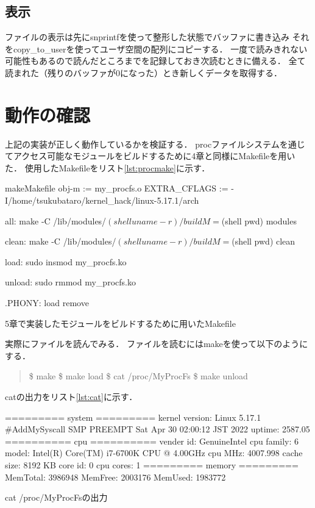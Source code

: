 \subsection{表示}
ファイルの表示は先にsnprintfを使って整形した状態でバッファに書き込み
それをcopy_to_userを使ってユーザ空間の配列にコピーする．
一度で読みきれない可能性もあるので読んだところまでを記録しておき次読むときに備える．
全て読まれた（残りのバッファが0になった）とき新しくデータを取得する．

\section{動作の確認}
上記の実装が正しく動作しているかを検証する．
procファイルシステムを通じてアクセス可能なモジュールをビルドするために4章と同様にMakefileを用いた．
使用したMakefileをリスト\ref{lst:procmake}に示す．
\begin{longlisting}
\begin{myminted}{make}{Makefile}
obj-m := my_procfs.o
EXTRA_CFLAGS := -I/home/tsukubataro/kernel_hack/linux-5.17.1/arch

all:
	make -C /lib/modules/$(shell uname -r)/build M=$(shell pwd) modules

clean:
	make -C /lib/modules/$(shell uname -r)/build M=$(shell pwd) clean

load:
	sudo insmod my_procfs.ko

unload:
	sudo rmmod my_procfs.ko

.PHONY: load remove
\end{myminted}
\caption{5章で実装したモジュールをビルドするために用いたMakefile}
\label{lst:procmake}
\end{longlisting}

実際にファイルを読んでみる．
ファイルを読むにはmakeを使って以下のようにする．
\begin{quote}
\$ make
\$ make load
\$ cat /proc/MyProcFs
\$ make unload
\end{quote}

catの出力をリスト\ref{lst:cat}に示す．
\begin{longlisting}
\begin{myminted}{}{}
========= system =========
kernel version: Linux 5.17.1 #AddMySyscall SMP PREEMPT Sat Apr 30 02:00:12 JST 2022
uptime: 2587.05
========== cpu ==========
vender id: GenuineIntel
cpu family: 6
model: Intel(R) Core(TM) i7-6700K CPU @ 4.00GHz
cpu MHz: 4007.998
cache size: 8192 KB
core id: 0
cpu cores: 1
========= memory =========
MemTotal: 3986948
MemFree: 2003176
MemUsed: 1983772
\end{myminted}
\caption{cat /proc/MyProcFsの出力}
\label{lst:cat}
\end{longlisting}

